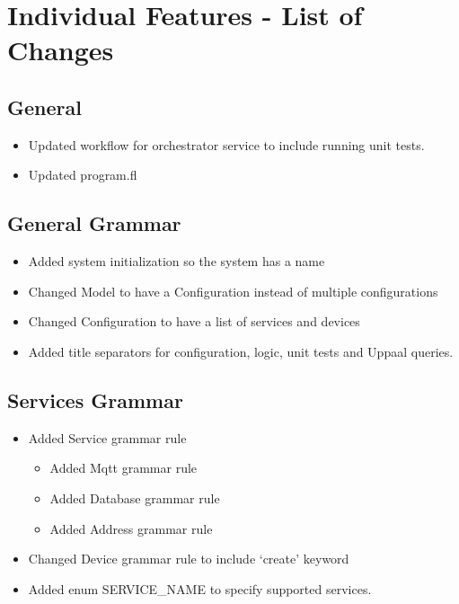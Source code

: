 \section{Individual Features - List of Changes}\label{appendix:individual-feature-list-of-changes}

\hypertarget{general}{%
\subsection{General}\label{general}}

\begin{itemize}
\item
  Updated workflow for orchestrator service to include running unit
  tests.
\item
  Updated program.fl
\end{itemize}

\hypertarget{general-grammar}{%
\subsection{General Grammar}\label{general-grammar}}

\begin{itemize}

\item
  Added system initialization so the system has a name
\item
  Changed Model to have a Configuration instead of multiple
  configurations
\item
  Changed Configuration to have a list of services and devices
\item
  Added title separators for configuration, logic, unit tests and Uppaal
  queries.
\end{itemize}

\hypertarget{services-grammar}{%
\subsection{Services Grammar}\label{services-grammar}}

\begin{itemize}
\item
  Added Service grammar rule

  \begin{itemize}
  \item
    Added Mqtt grammar rule
  \item
    Added Database grammar rule
  \item
    Added Address grammar rule
  \end{itemize}
\item
  Changed Device grammar rule to include `create' keyword
\item
  Added enum SERVICE\_NAME to specify supported services.
\end{itemize}

